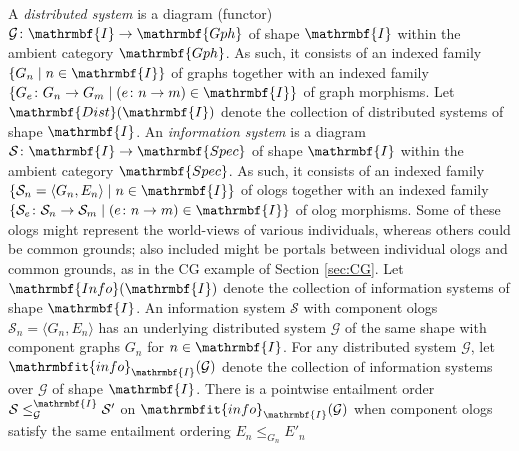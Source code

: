 \documentclass{amsart}
\theoremstyle{remark}
\theoremstyle{definition}
\begin{document}
A {\em distributed system} is a diagram (functor)
$\mathcal{G} \colon \mathrmbf{I} \rightarrow \mathrmbf{Gph}$
of shape $\mathrmbf{I}$
within the ambient category $\mathrmbf{Gph}$.
As such,
it consists of an indexed family 
$\{ G_{n} \mid n \in \mathrmbf{I} \}$
of graphs together with an indexed family 
$\{ G_{e} \colon G_{n} \rightarrow G_{m} \mid (e \colon n \rightarrow m) \in \mathrmbf{I} \}$
of graph morphisms.
Let $\mathrmbf{Dist}(\mathrmbf{I})$ denote 
the collection of distributed systems of shape $\mathrmbf{I}$.
%
An {\em information system} is a diagram
$\mathcal{S} \colon \mathrmbf{I} \rightarrow \mathrmbf{Spec}$
of shape $\mathrmbf{I}$
within the ambient category $\mathrmbf{Spec}$.
As such,
it consists of an indexed family 
$\{ \mathcal{S}_{n} = {\langle{G_{n},E_{n}}\rangle} \mid n \in \mathrmbf{I} \}$
of ologs together with an indexed family 
$\{ \mathcal{S}_{e} \colon \mathcal{S}_{n} \rightarrow \mathcal{S}_{m} \mid (e \colon n \rightarrow m) \in \mathrmbf{I} \}$
of olog morphisms.
Some of these ologs might represent the world-views of various individuals,
whereas others could be common grounds;
also included might be portals between individual ologs and common grounds,
as in the CG example of Section \ref{sec:CG}.
%
%
Let $\mathrmbf{Info}(\mathrmbf{I})$ denote 
the collection of information systems of shape $\mathrmbf{I}$.
%
An information system $\mathcal{S}$ with component ologs $\mathcal{S}_{n} = {\langle{G_{n},E_{n}}\rangle}$
has an underlying distributed system $\mathcal{G}$ of the same shape with component graphs $G_{n}$ for $n \in \mathrmbf{I}$.
%
%
For any distributed system $\mathcal{G}$,
let $\mathrmbfit{info}_{\mathrmbf{I}}(\mathcal{G})$ denote 
the collection of information systems over $\mathcal{G}$ of shape $\mathrmbf{I}$.
%
There is a pointwise entailment order $\mathcal{S} \leq^{\mathrmbf{I}}_{\mathcal{G}} \mathcal{S}'$
on $\mathrmbfit{info}_{\mathrmbf{I}}(\mathcal{G})$
when component ologs satisfy the same entailment ordering $E_{n} \leq_{G_{n}} E'_{n}$ 
\end{document}
